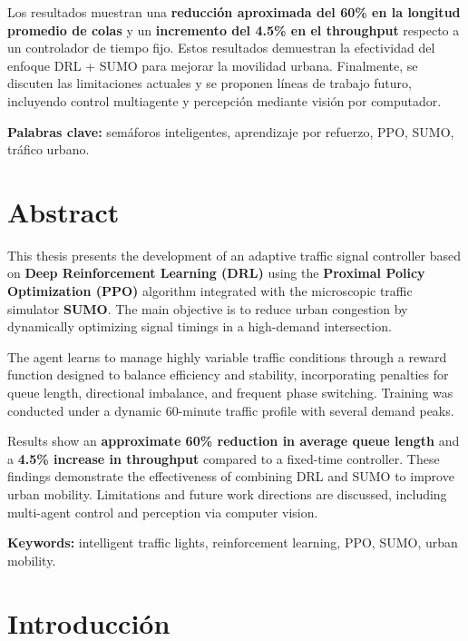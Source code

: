 \documentclass[12pt, a4paper]{report}
\begin{document}
Los resultados muestran una \textbf{reducción aproximada del 60\% en la longitud promedio de colas} y un \textbf{incremento del 4.5\% en el throughput} respecto a un controlador de tiempo fijo. Estos resultados demuestran la efectividad del enfoque DRL + SUMO para mejorar la movilidad urbana. Finalmente, se discuten las limitaciones actuales y se proponen líneas de trabajo futuro, incluyendo control multiagente y percepción mediante visión por computador.

\vspace{1em}
\noindent \textbf{Palabras clave:} semáforos inteligentes, aprendizaje por refuerzo, PPO, SUMO, tráfico urbano.

\chapter*{Abstract}

This thesis presents the development of an adaptive traffic signal controller based on \textbf{Deep Reinforcement Learning (DRL)} using the \textbf{Proximal Policy Optimization (PPO)} algorithm integrated with the microscopic traffic simulator \textbf{SUMO}. The main objective is to reduce urban congestion by dynamically optimizing signal timings in a high-demand intersection.

The agent learns to manage highly variable traffic conditions through a reward function designed to balance efficiency and stability, incorporating penalties for queue length, directional imbalance, and frequent phase switching. Training was conducted under a dynamic 60-minute traffic profile with several demand peaks.

Results show an \textbf{approximate 60\% reduction in average queue length} and a \textbf{4.5\% increase in throughput} compared to a fixed-time controller. These findings demonstrate the effectiveness of combining DRL and SUMO to improve urban mobility. Limitations and future work directions are discussed, including multi-agent control and perception via computer vision.

\vspace{1em}
\noindent \textbf{Keywords:} intelligent traffic lights, reinforcement learning, PPO, SUMO, urban mobility.

\tableofcontents

\chapter*{Introducción}
\end{document}
